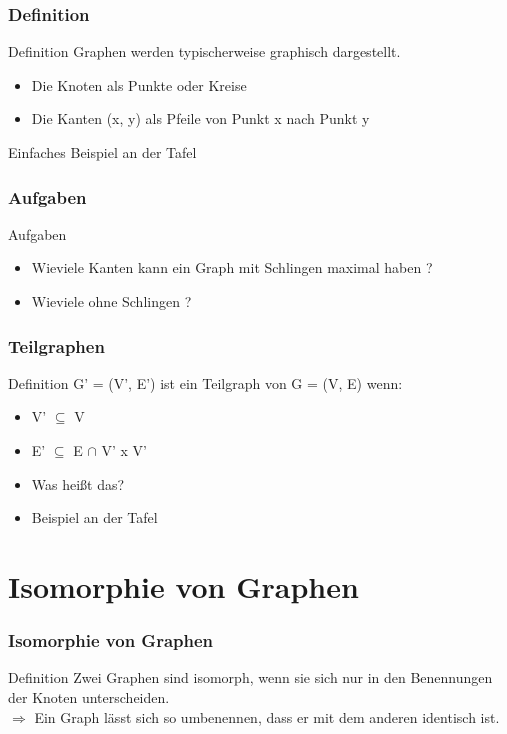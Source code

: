 \documentclass{beamer}
\begin{document}
\begin{frame}
	\frametitle{Definition}
	\begin{block}{Definition }
		Graphen werden typischerweise graphisch dargestellt.
		\begin{itemize}
			\item Die Knoten als Punkte oder Kreise
			\item Die Kanten (x, y) als Pfeile von Punkt x nach Punkt y
		\end{itemize}
	\end{block}

	\begin{example}
		Einfaches Beispiel an der Tafel
	\end{example}
\end{frame}

\begin{frame}
	\frametitle{Aufgaben}
	\begin{block}{Aufgaben }
		\begin{itemize}
			\item Wieviele Kanten kann ein Graph mit Schlingen maximal haben ?
			\item Wieviele ohne Schlingen ?
		\end{itemize}
	\end{block}
\end{frame}

\begin{frame}
	\frametitle{Teilgraphen}
	\begin{block}{Definition}
		 G' = (V', E') ist ein Teilgraph von G = (V, E) wenn:
		\begin{itemize}
			\item V' $\subseteq$ V
			\item E' $\subseteq$ E $\cap$ V' x V'
			\item Was hei{\ss}t das?
			\item Beispiel an der Tafel
		\end{itemize}	
	\end{block}
\end{frame}

\section{Isomorphie von Graphen}
\begin{frame}
	\frametitle{Isomorphie von Graphen}
	\begin{block}{Definition}
		Zwei Graphen sind isomorph, wenn sie sich nur in den Benennungen der Knoten unterscheiden.\\
		$\Rightarrow$ Ein Graph lässt sich so umbenennen, dass er mit dem anderen identisch ist.
	\end{block}
\end{frame}
\end{document}
